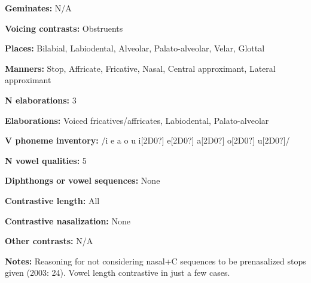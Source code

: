 \begin{styleBody}
\textbf{Geminates:} N/A
\end{styleBody}

\begin{styleBody}
\textbf{Voicing contrasts:} Obstruents
\end{styleBody}

\begin{styleBody}
\textbf{Places:} Bilabial, Labiodental, Alveolar, Palato-alveolar, Velar, Glottal
\end{styleBody}

\begin{styleBody}
\textbf{Manners:} Stop, Affricate, Fricative, Nasal, Central approximant, Lateral approximant
\end{styleBody}

\begin{styleBody}
\textbf{N elaborations:} 3
\end{styleBody}

\begin{styleBody}
\textbf{Elaborations:} Voiced fricatives/affricates, Labiodental, Palato-alveolar
\end{styleBody}

\begin{styleBody}
\textbf{V phoneme inventory:} /i e a o u i[2D0?] e[2D0?] a[2D0?] o[2D0?] u[2D0?]/
\end{styleBody}

\begin{styleBody}
\textbf{N vowel qualities:} 5
\end{styleBody}

\begin{styleBody}
\textbf{Diphthongs or vowel sequences:} None
\end{styleBody}

\begin{styleBody}
\textbf{Contrastive length:} All
\end{styleBody}

\begin{styleBody}
\textbf{Contrastive nasalization:} None
\end{styleBody}

\begin{styleBody}
\textbf{Other contrasts:} N/A
\end{styleBody}

\begin{styleBody}
\textbf{Notes:} Reasoning for not considering nasal+C sequences to be prenasalized stops given (2003: 24). Vowel length contrastive in just a few cases.
\end{styleBody}

